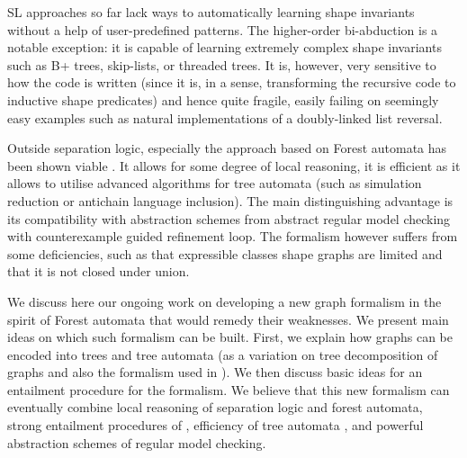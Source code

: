 {SL approaches so far lack ways to automatically learning shape invariants without a help of user-predefined patterns. 
%
The higher-order bi-abduction \cite{locle:secondorder} is a notable exception: it is capable of learning extremely complex shape invariants such as B+ trees, skip-lists, or threaded trees. 
%
It is, however, very sensitive to how the code is written (since it is, in a sense, transforming the recursive code to inductive shape predicates) and hence quite fragile, easily failing on seemingly easy examples such as natural implementations of a doubly-linked list reversal. 

Outside separation logic, especially the approach based on Forest automata \cite{forester11,forester12,holik_boxes_2013,vmcai17} has been shown viable \cite{svcomp15-forester,holik_run_2016,holik_forester_2017}. It allows for some degree of local reasoning, it is efficient as it allows to utilise advanced algorithms for tree automata (such as simulation reduction or antichain language inclusion). The main distinguishing advantage is its compatibility with abstraction schemes from abstract regular model checking \cite{svcomp15-forester} with counterexample guided refinement loop. The formalism however suffers from some deficiencies, such as that expressible classes shape graphs are limited and that it is not closed under union.

We discuss here our ongoing work on developing a new graph formalism in the spirit of Forest automata that would remedy their weaknesses.
%
We present main ideas on which such formalism can be built. 
First, we explain how graphs can be encoded into trees and tree automata (as a variation on tree decomposition of graphs \cite{Courcelle} and also the formalism used in \cite{iosif_treewidth_2013,iosif_deciding_2014}).
We then discuss basic ideas for an entailment procedure for the formalism.
%
We believe that this new formalism can eventually combine local reasoning of separation logic and forest automata, strong entailment procedures of \cite{Katelaan:seplog,pagel,Iosif:CSL,Iosif:LPAR}, efficiency of tree automata \cite{tacas10,almeida_reduction_2016,abdulla_computing_2008,libvata}, and powerful abstraction schemes of regular model checking.

}
